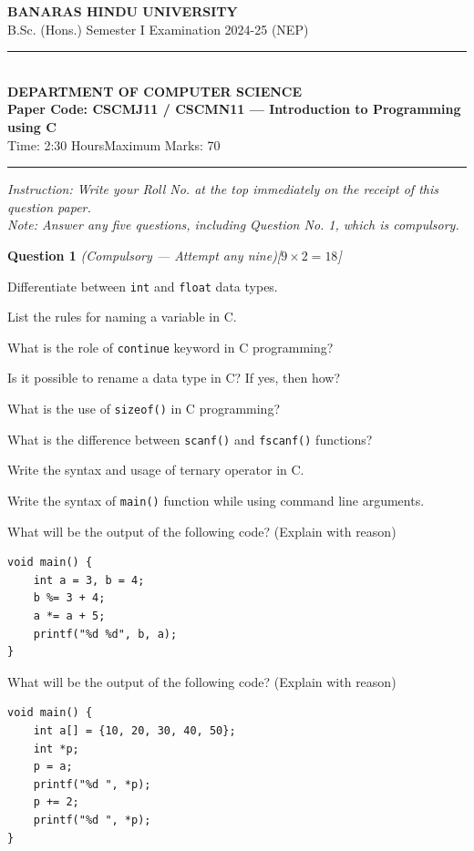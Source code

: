 \documentclass[11pt,a4paper]{article}
\newcommand{\pts}[1]{\hfill   \textit{[#1]}}
\begin{document}
\begin{center}
  {\large\bfseries BANARAS HINDU UNIVERSITY}\\[2pt]
  {
\normalsize B.Sc. (Hons.) Semester I Examination 2024-25 (NEP)}\\[6pt]
  \rule{0.8\linewidth}{0.5pt}\\[6pt]
  {\large\bfseries DEPARTMENT OF COMPUTER SCIENCE}\\[4pt]
  {\large\bfseries Paper Code: CSCMJ11 / CSCMN11 --- Introduction to Programming using C}\\[4pt]
  {
\normalsize Time: 2:30 Hours\hfill Maximum Marks: 70}
\end{center}

\rule{\linewidth}{0.4pt}\smallskip



\noindent   \textit{Instruction: Write your Roll No. at the top immediately on the receipt of this question paper.}\\[2pt]



\noindent   \textit{Note: Answer any five questions, including Question No. 1, which is compulsory.}
\bigskip




\noindent   \textbf{Question 1}   \textit{(Compulsory --- Attempt any nine)}\pts{$9  \times 2 = 18$}

\begin{parts}
  \item Differentiate between   \texttt{int} and   \texttt{float} data types.
  \item List the rules for naming a variable in C.
  \item What is the role of   \texttt{continue} keyword in C programming?
  \item Is it possible to rename a data type in C? If yes, then how?
  \item What is the use of   \texttt{sizeof()} in C programming?
  \item What is the difference between   \texttt{scanf()} and   \texttt{fscanf()} functions?
  \item Write the syntax and usage of ternary operator in C.
  \item Write the syntax of   \texttt{main()} function while using command line arguments.
  \item What will be the output of the following code? (Explain with reason)

\begin{lstlisting}
void main() {
    int a = 3, b = 4;
    b %= 3 + 4;
    a *= a + 5;
    printf("%d %d", b, a);
}
\end{lstlisting}
  \item What will be the output of the following code? (Explain with reason)

\begin{lstlisting}
void main() {
    int a[] = {10, 20, 30, 40, 50};
    int *p;
    p = a;
    printf("%d ", *p);
    p += 2;
    printf("%d ", *p);
}
\end{lstlisting}
\end{parts}
\end{document}

